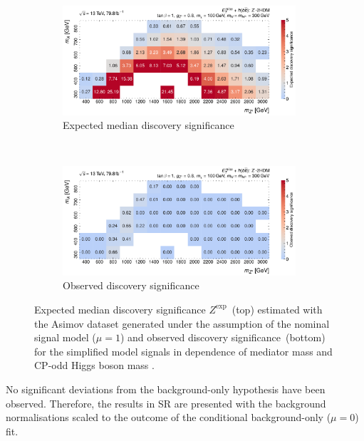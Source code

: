 \begin{figure}[htbp]
\centering
  \begin{subfigure}{1.\textwidth}
    \centering
    \includegraphics[width=0.95\textwidth]{figures/monoH/monoHbb-zhdm-significances_expected.pdf}
    \caption{Expected median discovery significance}
  \end{subfigure}
  \\
  \begin{subfigure}{1.\textwidth}
    \centering
    \includegraphics[width=0.95\textwidth]{figures/monoH/monoHbb-zhdm-significances_observed.pdf}
    \caption{Observed discovery significance}
  \end{subfigure}
  \caption{Expected median discovery significance \(Z^{\text{exp}}\)~(top) estimated with the Asimov dataset generated under the assumption of the nominal signal model (\(\mu=1\)) and observed discovery significance~(bottom) for the \zhdm simplified model signals in dependence of \PZprime mediator mass \mZp and CP-odd Higgs boson mass \mA.}
  \label{fig:monoH:results:results:observed:significance}
\end{figure}

No significant deviations from the background-only hypothesis have been observed. Therefore, the results in SR are presented with the background normalisations scaled to the outcome of the conditional background-only (\(\mu = 0\)) fit.

